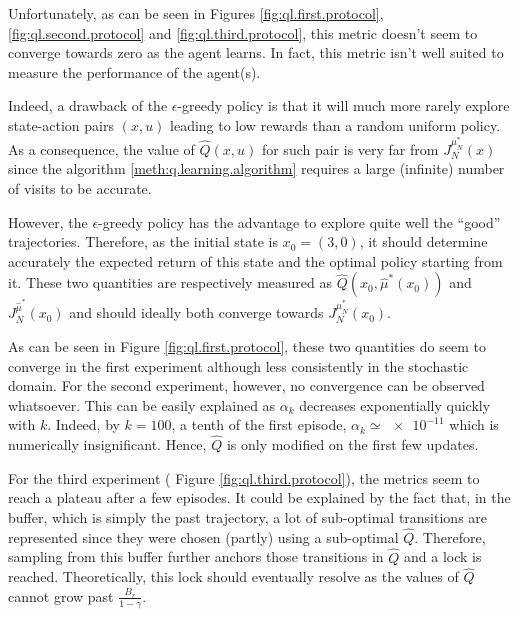 \documentclass[a4paper, 12pt]{article}
\begin{document}
    Unfortunately, as can be seen in Figures \ref{fig:ql.first.protocol}, \ref{fig:ql.second.protocol} and \ref{fig:ql.third.protocol}, this metric doesn't seem to converge towards zero as the agent learns. In fact, this metric isn't well suited to measure the performance of the agent(s).
    
    Indeed, a drawback of the $\epsilon$-greedy policy is that it will much more rarely explore state-action pairs $(x, u)$ leading to low rewards than a random uniform policy. As a consequence, the value of $\hat{Q}(x, u)$ for such pair is very far from $J^{\mu^*_N}_N(x)$ since the algorithm \ref{meth:q.learning.algorithm} requires a large (infinite) number of visits to be accurate.
    
    However, the $\epsilon$-greedy policy has the advantage to explore quite well the \enquote{good} trajectories. Therefore, as the initial state is $x_0 = (3, 0)$, it should determine accurately the expected return of this state and the optimal policy starting from it. These two quantities are respectively measured as $\hat{Q}(x_0, \hat{\mu}^*(x_0))$ and $J^{\hat{\mu}^*}_N(x_0)$ and should ideally both converge towards $J^{\mu^*_N}_N(x_0)$.
    
    As can be seen in Figure \ref{fig:ql.first.protocol}, these two quantities do seem to converge in the first experiment although less consistently in the stochastic domain. For the second experiment, however, no convergence can be observed whatsoever. This can be easily explained as $\alpha_k$ decreases exponentially\footnotemark{} quickly with $k$. Indeed, by $k = 100$, \ie{} a tenth of the first episode, $\alpha_k \simeq \num{e-11}$ which is numerically insignificant. Hence, $\hat{Q}$ is only modified on the first few updates.
    
    
    For the third experiment (\cf{} Figure \ref{fig:ql.third.protocol}), the metrics seem to reach a plateau after a few episodes. It could be explained by the fact that, in the buffer, which is simply the past trajectory, a lot of sub-optimal transitions are represented since they were chosen (partly) using a sub-optimal $\hat{Q}$. Therefore, sampling from this buffer further anchors those transitions in $\hat{Q}$ and a lock is reached. Theoretically, this lock should eventually resolve as the values of $\hat{Q}$ cannot grow past $\frac{B_r}{1 - \gamma}$.
    
\end{document}
